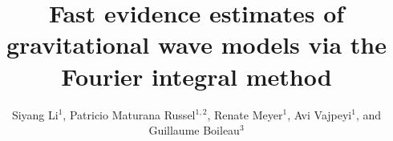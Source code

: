 \documentclass[%
 reprint,
 amsmath,amssymb,
 aps,
]{revtex4-2}
\begin{document}

\title{Fast evidence estimates of gravitational wave models via the Fourier integral method}

\author{Siyang Li$^{1}$,  Patricio Maturana Russel$^{1,2}$, Renate Meyer$^1$, Avi Vajpeyi$^1$, and Guillaume Boileau$^3$}

\newcommand{\pmr}[1]{\textcolor{purple}{[PMR: #1]}}
\newcommand{\jason}[1]{\textcolor{blue}{[jason: #1]}}
\newcommand{\avi}[1]{\textcolor{orange}{[Avi: #1]}}
\newcommand{\todo}[1]{\textcolor{olive}{TODO: #1}}
\newcommand{\citeme}{\textcolor{purple}{(cite)}}





\end{document}
